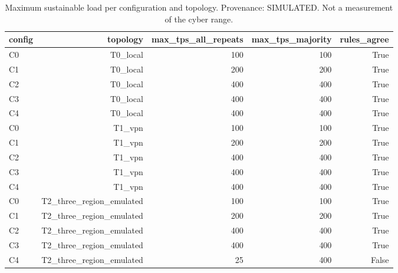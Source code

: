\begin{table}[t]
\caption{Maximum sustainable load per configuration and topology. Provenance: SIMULATED.  Not a measurement of the cyber range.}
\label{tab:table_max_sustainable_load}
\centering
\begin{tabular}{lrrrr}
\hline
config & topology & max\_tps\_all\_repeats & max\_tps\_majority & rules\_agree \\
\hline
C0 & T0\_local & 100 & 100 & True \\
C1 & T0\_local & 200 & 200 & True \\
C2 & T0\_local & 400 & 400 & True \\
C3 & T0\_local & 400 & 400 & True \\
C4 & T0\_local & 400 & 400 & True \\
C0 & T1\_vpn & 100 & 100 & True \\
C1 & T1\_vpn & 200 & 200 & True \\
C2 & T1\_vpn & 400 & 400 & True \\
C3 & T1\_vpn & 400 & 400 & True \\
C4 & T1\_vpn & 400 & 400 & True \\
C0 & T2\_three\_region\_emulated & 100 & 100 & True \\
C1 & T2\_three\_region\_emulated & 200 & 200 & True \\
C2 & T2\_three\_region\_emulated & 400 & 400 & True \\
C3 & T2\_three\_region\_emulated & 400 & 400 & True \\
C4 & T2\_three\_region\_emulated & 25 & 400 & False \\
\hline
\end{tabular}
\end{table}

